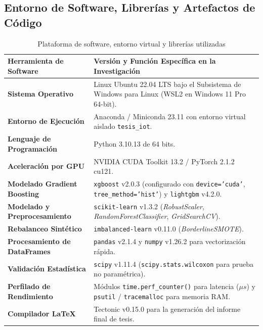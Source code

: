 \subsection{Entorno de Software, Librerías y Artefactos de Código}
\begin{table}[H]
\centering
\caption{Plataforma de software, entorno virtual y librerías utilizadas}
\label{tab:software_2_mm}
\small



\begin{tabularx}{\textwidth}{p{4.0cm} X}
\toprule
\textbf{Herramienta de Software} & \textbf{Versión y Función Específica en la Investigación} \\
\midrule
\textbf{Sistema Operativo} & Linux Ubuntu 22.04 LTS bajo el Subsistema de Windows para Linux (WSL2 en Windows 11 Pro 64-bit). \\
\textbf{Entorno de Ejecución} & Anaconda / Miniconda 23.11 con entorno virtual aislado \texttt{tesis\_iot}. \\
\textbf{Lenguaje de Programación} & Python 3.10.13 de 64 bits. \\
\textbf{Aceleración por GPU} & NVIDIA CUDA Toolkit 13.2 / PyTorch 2.1.2 cu121. \\
\textbf{Modelado Gradient Boosting} & \texttt{xgboost} v2.0.3 (configurado con \texttt{device='cuda'}, \texttt{tree\_method='hist'}) y \texttt{lightgbm} v4.2.0. \\
\textbf{Modelado y Preprocesamiento} & \texttt{scikit-learn} v1.3.2 (\textit{RobustScaler}, \textit{RandomForestClassifier}, \textit{GridSearchCV}). \\
\textbf{Rebalanceo Sintético} & \texttt{imbalanced-learn} v0.11.0 (\textit{BorderlineSMOTE}). \\
\textbf{Procesamiento de DataFrames} & \texttt{pandas} v2.1.4 y \texttt{numpy} v1.26.2 para vectorización rápida. \\
\textbf{Validación Estadística} & \texttt{scipy} v1.11.4 (\texttt{scipy.stats.wilcoxon} para prueba no paramétrica). \\
\textbf{Perfilado de Rendimiento} & Módulos \texttt{time.perf\_counter()} para latencia ($\mu s$) y \texttt{psutil} / \texttt{tracemalloc} para memoria RAM. \\
\textbf{Compilador LaTeX} & Tectonic v0.15.0 para la generación del informe final de tesis. \\
\bottomrule
\end{tabularx}
\end{table}

